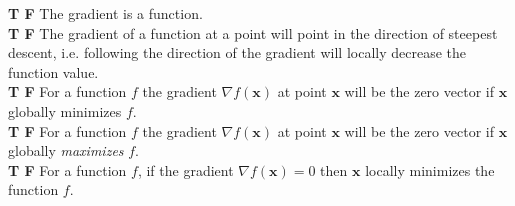 \textbf{T F} The gradient is a function. \\
\textbf{T F} The gradient of a function at a point will 
point in the direction of steepest descent, i.e.
following the direction of the gradient will locally 
decrease the function value. \\
\textbf{T F} For a function $f$ the gradient $\nabla f(\mathbf{x})$  at point $\mathbf{x}$
will be the zero vector if $\mathbf{x}$ globally minimizes $f$.\\
\textbf{T F} For a function $f$  the gradient $\nabla f(\mathbf{x})$   at point  $\mathbf{x}$ 
will be the zero vector  if  $\mathbf{x}$  globally \textit{maximizes} $f$.\\
\textbf{T F} For a function $f$, if the gradient $\nabla f(\mathbf{x}) = 0$ then
$\mathbf{x}$ locally minimizes the function $f$.

